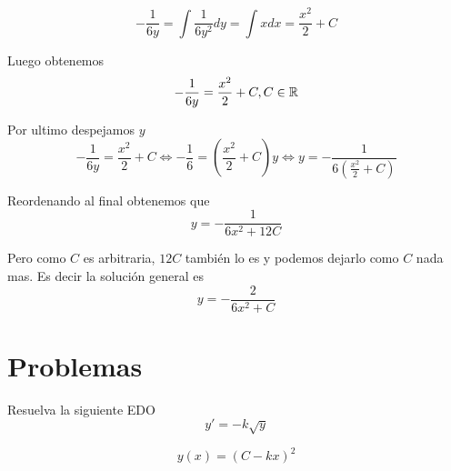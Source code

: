 \documentclass[a4paper,oneside,10.5pt]{article}
\begin{document}
\begin{enumerate}
\begin{ejemplo}
    \begin{equation*}
    -\frac{1}{6y} = \int \frac{1}{6y^{2}}  dy = \int x dx = \frac{x^{2}}{2} + C
    \end{equation*}

    Luego obtenemos
    \begin{equation*}
     -\frac{1}{6y} = \frac{x^{2}}{2} + C, C \in \mathbb{R}
    \end{equation*}

    Por ultimo despejamos $y$
    \begin{equation*}
      -\frac{1}{6y} = \frac{x^{2}}{2} + C \iff -\frac{1}{6} = (\frac{x^{2}}{2} + C)y \iff y = -\frac{1}{6(\frac{x^{2}}{2} + C)}
    \end{equation*}

    Reordenando al final obtenemos que
    \begin{equation*}
      y = -\frac{1}{6x^{2} + 12C}
    \end{equation*}

    Pero como $C$ es arbitraria, $12C$ también lo es y podemos dejarlo como $C$ nada mas.
    Es decir la solución general es
    \begin{equation*}
      y = -\frac{2}{6x^{2} + C}
    \end{equation*}
  \end{ejemplo}

\end{enumerate}
\section*{Problemas}
\begin{prob}
  Resuelva la siguiente EDO
  \begin{equation*}
    y' = -k\sqrt{y}
  \end{equation*}
\end{prob}
\begin{sol}
  \begin{equation*}
    y(x) = (C - kx)^{2}
  \end{equation*}
\end{sol}
\end{document}
